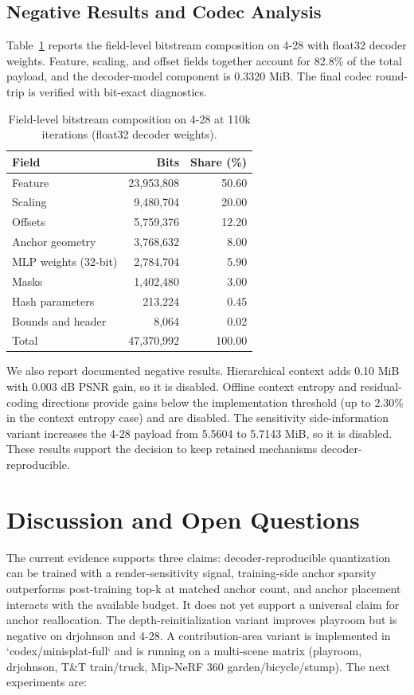 \documentclass{article}
\begin{document}
\subsection{Negative Results and Codec Analysis}
Table~\ref{tab:bitstream} reports the field-level bitstream composition on 4-28 with float32 decoder weights. Feature, scaling, and offset fields together account for 82.8\% of the total payload, and the decoder-model component is 0.3320 MiB. The final codec round-trip is verified with bit-exact diagnostics.

\begin{table}[t]
\centering
\caption{Field-level bitstream composition on 4-28 at 110k iterations (float32 decoder weights).}
\label{tab:bitstream}
\begin{tabular}{lrr}
\toprule
Field & Bits & Share (\%) \\
\midrule
Feature & 23,953,808 & 50.60 \\
Scaling & 9,480,704 & 20.00 \\
Offsets & 5,759,376 & 12.20 \\
Anchor geometry & 3,768,632 & 8.00 \\
MLP weights (32-bit) & 2,784,704 & 5.90 \\
Masks & 1,402,480 & 3.00 \\
Hash parameters & 213,224 & 0.45 \\
Bounds and header & 8,064 & 0.02 \\
\midrule
Total & 47,370,992 & 100.00 \\
\bottomrule
\end{tabular}
\end{table}

We also report documented negative results. Hierarchical context adds 0.10 MiB with 0.003 dB PSNR gain, so it is disabled. Offline context entropy and residual-coding directions provide gains below the implementation threshold (up to 2.30\% in the context entropy case) and are disabled. The sensitivity side-information variant increases the 4-28 payload from 5.5604 to 5.7143 MiB, so it is disabled. These results support the decision to keep retained mechanisms decoder-reproducible.

\section{Discussion and Open Questions}
The current evidence supports three claims: decoder-reproducible quantization can be trained with a render-sensitivity signal, training-side anchor sparsity outperforms post-training top-k at matched anchor count, and anchor placement interacts with the available budget. It does not yet support a universal claim for anchor reallocation. The depth-reinitialization variant improves playroom but is negative on drjohnson and 4-28. A contribution-area variant is implemented in `codex/minisplat-full` and is running on a multi-scene matrix (playroom, drjohnson, T\&T train/truck, Mip-NeRF 360 garden/bicycle/stump). The next experiments are:
\end{document}
